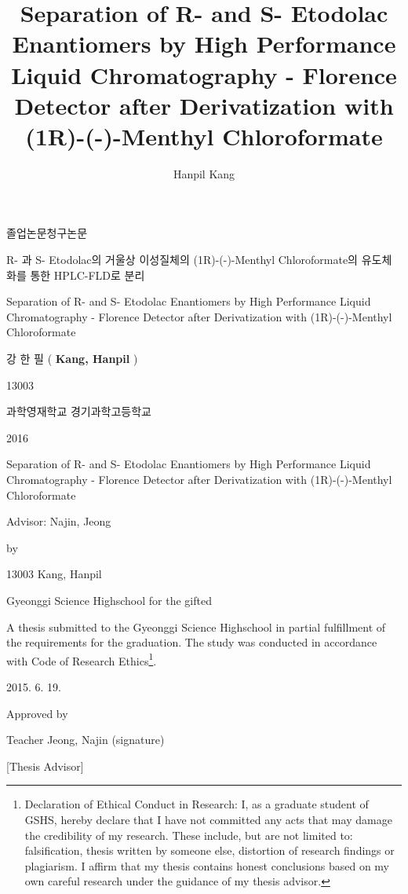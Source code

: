 \documentclass[12pt]{article} %
\title{Separation of R- and S- Etodolac Enantiomers by High Performance Liquid Chromatography - Florence Detector after Derivatization with (1R)-(-)-Menthyl Chloroformate}
\author{Hanpil Kang}
\date{} %
\begin{document}
\begin{center}
	\large 졸업논문청구논문
	
	\vskip24mm
	
	\LARGE R- 과 S- Etodolac의 거울상 이성질체의 (1R)-(-)-Menthyl Chloroformate의 유도체화를 통한 HPLC-FLD로 분리
	
	\bigskip
	
	\Large Separation of R- and S- Etodolac Enantiomers by High Performance Liquid Chromatography - Florence Detector after Derivatization with (1R)-(-)-Menthyl Chloroformate
	
	\vfill
	
	강 한 필 ( \textbf{Kang, Hanpil} )
	
	13003
	
	\vskip12mm
	
	과학영재학교 경기과학고등학교
	
	2016
\end{center}
\pagebreak

\begin{center}
	\Large Separation of R- and S- Etodolac Enantiomers by High Performance Liquid Chromatography - Florence Detector after Derivatization with (1R)-(-)-Menthyl Chloroformate
	
	\bigskip
	
	Advisor: Najin, Jeong
	
	by
	
	13003 Kang, Hanpil
	
	\vskip-2mm
	Gyeonggi Science Highschool for the gifted
\end{center}

{
\vskip24mm

\Large
\indent
A thesis submitted to the Gyeonggi Science Highschool in partial fulfillment of the requirements for the graduation. The study was conducted in accordance with Code of Research Ethics\footnote{Declaration of Ethical Conduct in Research: I, as a graduate student of GSHS, hereby declare that I have not committed any acts that may damage the credibility of my research. These include, but are not limited to: falsification, thesis written by someone else, distortion of research findings or plagiarism. I affirm that my thesis contains honest conclusions based on my own careful research under the guidance of my thesis advisor.}.
}

\vfill

{
\Large
\hskip72mm
2015. 6. 19.

\hskip72mm
Approved by

\hskip72mm
Teacher Jeong, Najin (signature)

\hskip72mm
[Thesis Advisor]
}
\pagebreak
\end{document}
